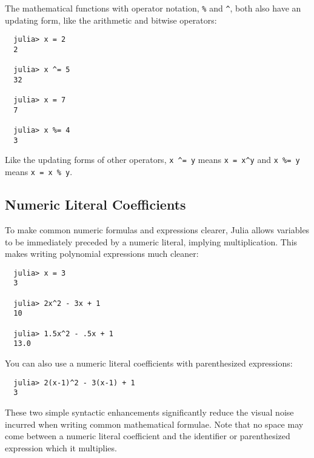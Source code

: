 \documentclass{article}
\begin{document}
The mathematical functions with operator notation, \verb|%| and \verb|^|, both also have an updating form, like the arithmetic and bitwise operators:
\begin{verbatim}
  julia> x = 2
  2

  julia> x ^= 5
  32

  julia> x = 7
  7

  julia> x %= 4
  3
\end{verbatim}
Like the updating forms of other operators, \verb|x ^= y| means \verb|x = x^y| and \verb|x %= y| means \verb|x = x % y|.

\subsection{Numeric Literal Coefficients}

To make common numeric formulas and expressions clearer, Julia allows variables to be immediately preceded by a numeric literal, implying multiplication.
This makes writing polynomial expressions much cleaner:
\begin{verbatim}
  julia> x = 3
  3

  julia> 2x^2 - 3x + 1
  10

  julia> 1.5x^2 - .5x + 1
  13.0
\end{verbatim}
You can also use a numeric literal coefficients with parenthesized expressions:
\begin{verbatim}
  julia> 2(x-1)^2 - 3(x-1) + 1
  3
\end{verbatim}
These two simple syntactic enhancements significantly reduce the visual noise incurred when writing common mathematical formulae.
Note that no space may come between a numeric literal coefficient and the identifier or parenthesized expression which it multiplies.
\end{document}
